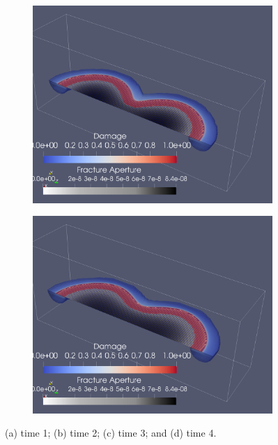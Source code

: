 \begin{figure}[h]
\bigskip
\begin{subfigure}{.45\textwidth}
  \centering
  \includegraphics[width=\linewidth]{Chapter4/figures/merging/merge_t_45(1).png}
  \caption{}
  \label{fig:merge_t_4}
\end{subfigure}
\hspace{0.85cm}
\begin{subfigure}{.45\textwidth}
  \centering
  \includegraphics[width=\linewidth]{Chapter4/figures/merging/merge_t_67(1).png}
  \caption{}
  \label{fig:merge_t_5}
\end{subfigure}
  \caption{(a) time 1; (b) time 2; (c) time 3; and (d) time 4. } 
  \label{fig:merge_snapshots}  
\end{figure}

\FloatBarrier


